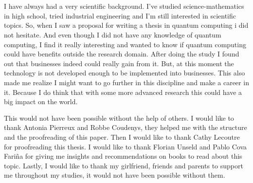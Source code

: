 
\chapter*{}
\label{ch:voorwoord}


I have always had a very scientific background. I've studied science-mathematics in high school, tried industrial engineering and I'm still interested in scientific topics.
So, when I saw a proposal for writing a thesis in quantum computing i did not hesitate.
And even though I did not have any knowledge of quantum computing, I find it really interesting and wanted to know if quantum computing could have benefits outside the research domain.
After doing the study I found out that businesses indeed could really gain from it. But, at this moment the technology is not developed enough to be implemented into businesses.
This also made me realize I might want to go further in this discipline and make a career in it. Because I do think that with some more advanced research this could have a big impact on the world.


This would not have been possible without the help of others.
I would like to thank Antonia Pierreux and Robbe Coudenys, they helped me with the structure and the proofreading of this paper.
Then I would like to thank Cathy Lecoutre for proofreading this thesis.
I would like to thank Florian Unseld and Pablo Cova Fariña for giving me insights and recommendations on books to read about this topic.
Lastly, I would like to thank my girlfriend, friends and parents to support me throughout my studies, it would not have been possible without them.

